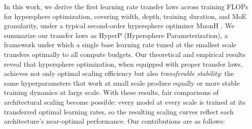 \documentclass{article}
\begin{document}
In this work, we derive the first learning rate transfer laws across training FLOPs for hypersphere optimization, covering width, depth, training duration, and MoE granularity, under a typical second-order hypersphere optimizer MuonH \cite{wen2025hyperball_part1}. We summarize our transfer laws as HyperP (Hypersphere Parameterization), a framework under which a single base learning rate tuned at the smallest scale transfers optimally to all compute budgets. Our theoretical and empirical results reveal that hypersphere optimization, when equipped with proper transfer laws, achieves not only optimal scaling efficiency but also \emph{transferable stability}: the same hyperparameters that work at small scale produce equally or more stable training dynamics at large scale. With these results, fair comparisons of architectural scaling become possible: every model at every scale is trained at its transferred optimal learning rates, so the resulting scaling curves reflect each architecture's near-optimal performance. Our contributions are as follows:
\end{document}
